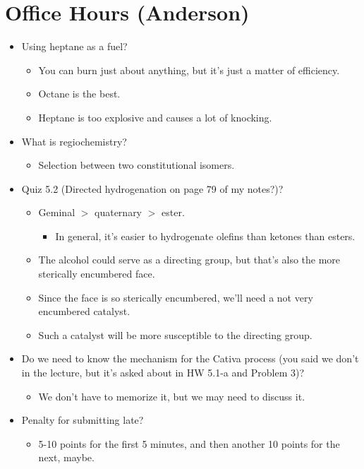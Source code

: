 \documentclass[../notes.tex]{subfiles}
\begin{document}
\section{Office Hours (Anderson)}
\begin{itemize}
    \item Using heptane as a fuel?
    \begin{itemize}
        \item You can burn just about anything, but it's just a matter of efficiency.
        \item Octane is the best.
        \item Heptane is too explosive and causes a lot of knocking.
    \end{itemize}
    \item What is regiochemistry?
    \begin{itemize}
        \item Selection between two constitutional isomers.
    \end{itemize}
    \item Quiz 5.2 (Directed hydrogenation on page 79 of my notes?)?
    \begin{itemize}
        \item Geminal $>$ quaternary $>$ ester.
        \begin{itemize}
            \item In general, it's easier to hydrogenate olefins than ketones than esters.
        \end{itemize}
        \item The alcohol could serve as a directing group, but that's also the more sterically encumbered face.
        \item Since the face is so sterically encumbered, we'll need a not very encumbered catalyst.
        \item Such a catalyst will be more susceptible to the directing group.
    \end{itemize}
    \item Do we need to know the mechanism for the Cativa process (you said we don't in the lecture, but it's asked about in HW 5.1-a and Problem 3)?
    \begin{itemize}
        \item We don't have to memorize it, but we may need to discuss it.
    \end{itemize}
    \item Penalty for submitting late?
    \begin{itemize}
        \item 5-10 points for the first 5 minutes, and then another 10 points for the next, maybe.

\end{itemize}
\end{itemize}
\end{document}
